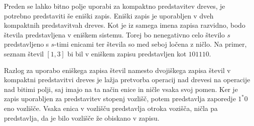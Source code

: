 Preden se lahko bitno polje uporabi za kompaktno predstavitev dreves, je potrebno predstaviti še eniški zapis. Eniški zapis je uporabljen v dveh kompaktnih predstavitvah dreves. Kot je iz samega imena zapisa razvidno, bodo števila predstavljena v eniškem sistemu. Torej bo nenegativno celo število $s$ predstavljeno s $s$-timi enicami ter števila so med seboj ločena z ničlo. Na primer, seznam števil $[1,3]$ bi bil v eniškem zapisu predstavljen kot $101110$.

Razlog za uporabo eniškega zapisa števil namesto dvojiškega zapisa števil v kompaktni predstavitvi dreves je lažja pretvorba operacij nad drevesi na operacije nad bitimi polji, saj imajo na ta način enice in ničle vsaka svoj pomen. Ker je zapis uporabljen za predstavitev stopenj vozlišč, potem predstavlja zaporedje $1^*0$ eno vozlišče. Vsaka enica v vozlišču predstavlja otroka vozišča, ničla pa predstavlja, da je bilo vozlišče že obiskano v zapisu.

